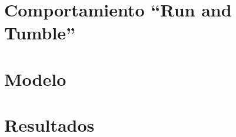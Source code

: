 \documentclass[../Main.tex]{subfiles}
\begin{document}
 \section{Comportamiento ``Run and Tumble''}
 \section{Modelo}
 \section{Resultados}
 
\end{document}
